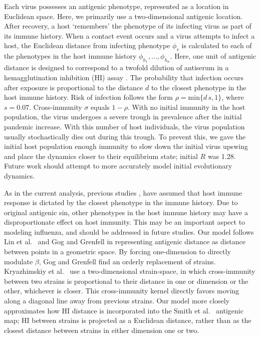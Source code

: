 \documentclass[11pt,oneside,letterpaper]{article}
\begin{document}
Each virus possesses an antigenic phenotype, represented as a location in Euclidean space.  Here, we primarily use a two-dimensional antigenic location.  After recovery, a host `remembers' the phenotype of its infecting virus as part of its immune history.  When a contact event occurs and a virus attempts to infect a host, the Euclidean distance from infecting phenotype $\phi_v$ is calculated to each of the phenotypes in the host immune history $\phi_{h_1}, \dots, \phi_{h_n}$.  Here, one unit of antigenic distance is designed to correspond to a twofold dilution of antiserum in a hemagglutination inhibition (HI) assay \cite{Smith04}. The probability that infection occurs after exposure is proportional to the distance $d$ to the closest phenotype in the host immune history.  Risk of infection follows the form $\rho = \mathrm{min}\{d\,s,1\}$, where $s=0.07$.  Cross-immunity $\sigma$ equals $1-\rho$.  With no initial immunity in the host population, the virus undergoes a severe trough in prevalence after the initial pandemic increase.  With this number of host individuals, the virus population usually stochastically dies out during this trough.  To prevent this, we gave the initial host population enough immunity to slow down the initial virus upswing and place the dynamics closer to their equilibrium state; initial $R$ was 1.28.  Future work should attempt to more accurately model initial evolutionary dynamics.

As in the current analysis, previous studies \cite{Ferguson03,Koelle06,Recker07}, have assumed that host immune response is dictated by the closest phenotype in the immune history.  Due to original antigenic sin, other phenotypes in the host immune history may have a disproportionate effect on host immunity.  This may be an important aspect to modeling influenza, and should be addressed in future studies.  Our model follows Lin et al.\ \cite{Lin99} and Gog and Grenfell \cite{Gog02} in representing antigenic distance as distance between points in a geometric space.  By forcing one-dimension to directly modulate $\beta$, Gog and Grenfell find an orderly replacement of strains.  Kryazhimskiy et al.\ \cite{Kryazhimskiy07} use a two-dimensional strain-space, in which cross-immunity between two strains is proportional to their distance in one or dimension or the other, whichever is closer.  This cross-immunity kernel directly favors moving along a diagonal line away from previous strains.  Our model more closely approximates how HI distance is incorporated into the Smith et al.\ \cite{Smith04} antigenic map; HI between strains is projected as a Euclidean distance, rather than as the closest distance between strains in either dimension one or two.
\end{document}
